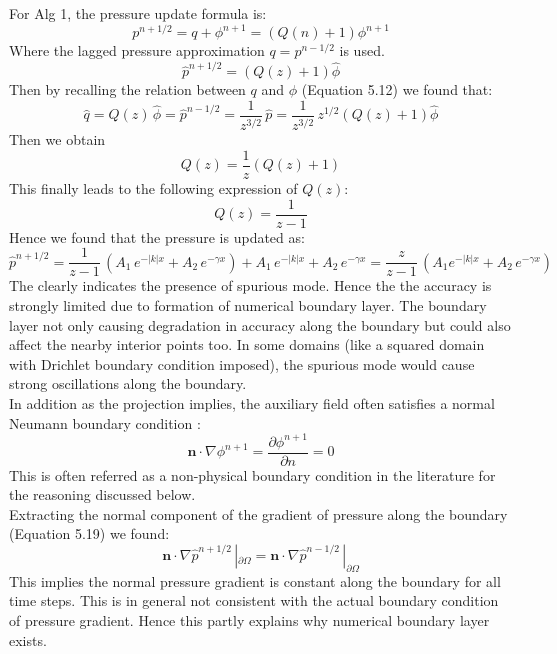 For Alg 1, the pressure update formula is:
\begin{equation}
p^{n+1/2} = q + \phi^{n+1} = (Q(n) + 1)\phi^{n+1}
\end{equation}
Where the lagged pressure approximation $q = p^{n-1/2}$ is used. \\
\begin{equation}
\hat{p}^{n+1/2} = (Q(z)+1)\hat{\phi}
\end{equation}
Then by recalling the relation between $q$ and $\phi$ (Equation 5.12) we found that:
\begin{equation*}
\hat{q} = Q(z)\,\hat{\phi} = \hat{p}^{n-1/2} = \dfrac{1}{z^{3/2}}\,\hat{p} = \dfrac{1}{z^{3/2}} \, z^{1/2} (Q(z) + 1) \hat{\phi}
\end{equation*}
Then we obtain
\begin{equation*}
Q(z) = \dfrac{1}{z} (Q(z) + 1)
\end{equation*}
This finally leads to the following expression of $Q(z)$:
\begin{equation}
Q(z) = \dfrac{1}{z-1}
\end{equation}
Hence we found that the pressure is updated as:
\begin{dmath}
\hat{p}^{n+1/2} = \dfrac{1}{z-1}\,(A_1\,e^{-|k|x} + A_2 \,e^{-\gamma x}) + A_1\,e^{-|k|x} + A_2 \,e^{-\gamma x}
= \dfrac{z}{z-1}\,\left(A_1 e^{-|k|x} +  A_2 \,e^{-\gamma x}\right)
\end{dmath}
The clearly indicates the presence of spurious mode. Hence the the accuracy is strongly limited due to formation of numerical boundary layer. The boundary layer not only causing degradation in accuracy along the boundary but could also affect the nearby interior points too. In some domains (like a squared domain with Drichlet boundary condition imposed), the spurious mode would cause strong oscillations along the boundary.\\

In addition as the projection implies, the auxiliary field often satisfies a normal Neumann boundary condition :
\begin{equation*}
\textbf{n} \cdot \nabla \phi^{n+1} = \dfrac{\partial \phi^{n+1}}{\partial n} = 0
\end{equation*}
This is often referred as a non-physical boundary condition in the literature \cite{strikwerda1999accuracy, guermond2004error, brown2001accurate} for the reasoning discussed below.\\
Extracting the normal component of the gradient of pressure along the boundary (Equation 5.19) we found:
\begin{equation}
\textbf{n} \cdot \nabla \hat{p}^{n+1/2}\,|_{\partial \Omega} = \textbf{n} \cdot \nabla \hat{p}^{n-1/2}\,|_{\partial \Omega}
\end{equation}
This implies the normal pressure gradient is constant along the boundary for all time steps. This is in general not consistent with the actual boundary condition of pressure gradient. Hence this partly explains why numerical boundary layer exists.\\

